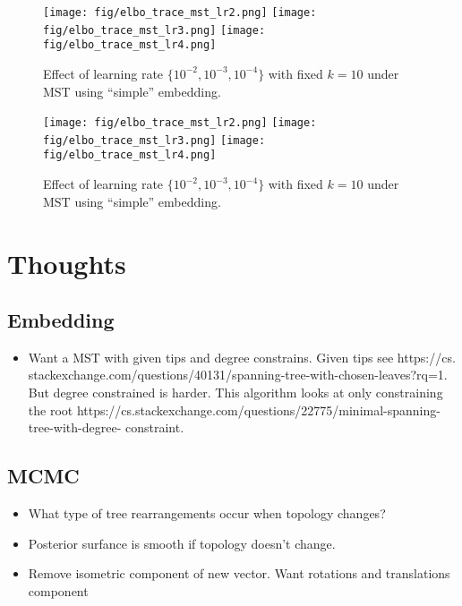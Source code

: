 \documentclass[11pt]{article}
\begin{document}
\begin{figure}[htbp]
\begin{center}
\texttt{[image: fig/elbo\_trace\_mst\_lr2.png]}%
\texttt{[image: fig/elbo\_trace\_mst\_lr3.png]}%
\texttt{[image: fig/elbo\_trace\_mst\_lr4.png]}
\caption{Effect of learning rate $\{10^{-2}, 10^{-3}, 10^{-4}\}$ with fixed $k=10$ under MST using ``simple'' embedding.}
\label{fig:lr}
\end{center}
\end{figure}

\begin{figure}[htbp]
\begin{center}
\texttt{[image: fig/elbo\_trace\_mst\_lr2.png]}%
\texttt{[image: fig/elbo\_trace\_mst\_lr3.png]}%
\texttt{[image: fig/elbo\_trace\_mst\_lr4.png]}
\caption{Effect of learning rate $\{10^{-2}, 10^{-3}, 10^{-4}\}$ with fixed $k=10$ under MST using ``simple'' embedding.}
\label{fig:lr}
\end{center}
\end{figure}



\section{Thoughts}
\subsection{Embedding}
\begin{itemize}
\item Want a MST with given tips and degree constrains.
Given tips see https://cs. stackexchange.com/questions/40131/spanning-tree-with-chosen-leaves?rq=1.
But degree constrained is harder. This algorithm looks at only constraining the root https://cs.stackexchange.com/questions/22775/minimal-spanning-tree-with-degree- constraint.
\end{itemize}

\subsection{MCMC}
\begin{itemize}
\item What type of tree rearrangements occur when topology changes?
\item Posterior surfance is smooth if topology doesn't change.
\item Remove isometric component of new vector. Want rotations and translations component 
\end{itemize}
\end{document}
